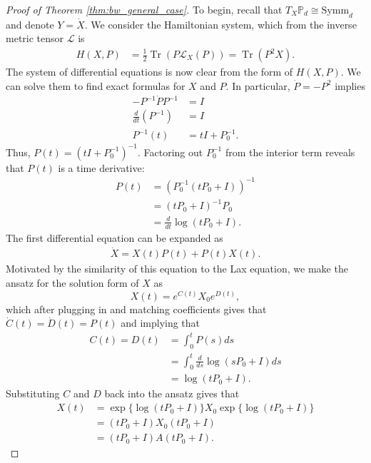 \documentclass{amsart}
\DeclareMathOperator{\Tr}{Tr}
\theoremstyle{definition}
\theoremstyle{remark}
\numberwithin{equation}{section}
\begin{document}
\begin{proof}[Proof of Theorem \ref{thm:bw_general_case}]
To begin, recall that $T_X\mathbb{P}_d \cong \text{Symm}_d$ and denote $Y = \dot{X}$. We consider the Hamiltonian system, which from the inverse metric tensor $\mathcal{L}$ is
\begin{align}
    H(X, P) &= \frac{1}{2}\Tr(P\mathcal{L}_X(P)) = \Tr(P^2X).
\end{align}
The system of differential equations is now clear from the form of $H(X,P)$. We can solve them to find exact formulas for $X$ and $P$. In particular, $\dot{P} = -P^2$ implies
\begin{align}
    -P^{-1} \dot{P} P^{-1} &= I \nonumber \\
    \frac{d}{dt}(P^{-1}) &= I \nonumber \\
    P^{-1}(t) &= tI + P^{-1}_0.
\end{align}
Thus, $P(t) = (tI + P^{-1}_0)^{-1}$. Factoring out $P^{-1}_0$ from the interior term reveals that $P(t)$ is a time derivative:
\begin{align}
    P(t) &= (P^{-1}_0(tP_0 + I))^{-1}  \nonumber \\
    &= (tP_0 + I)^{-1}P_0 \\
    &= \frac{d}{dt} \log (tP_0 + I).
\end{align}
The first differential equation can be expanded as
\begin{align}
    \dot{X} = X(t)P(t) + P(t)X(t).
\end{align}
Motivated by the similarity of this equation to the Lax equation, we make the ansatz for the solution form of $X$ as
\begin{equation}
    X(t) = e^{C(t)} X_0 e^{D(t)},
\end{equation}
which after plugging in and matching coefficients gives that $\dot{C}(t) = \dot{D}(t) = P(t)$ and implying that 
\begin{align}
    C(t) = D(t) &= \int_0^t P(s) ds\\
    &= \int_{0}^t \frac{d}{ds}\log(sP_0 + I) ds \\
    &= \log (tP_0+I).
\end{align}
Substituting $C$ and $D$ back into the ansatz gives that 
\begin{align}
    X(t) &= \exp\{\log (tP_0+I)\} X_0 \exp\{\log (tP_0+I)\}\nonumber \\
    &= (tP_0 + I) X_0 (tP_0 + I) \nonumber \\ 
    &= (tP_0 + I) A (tP_0 + I).
\end{align}

\end{proof}
\end{document}
